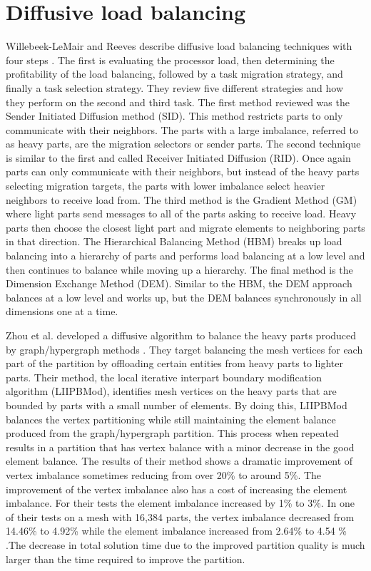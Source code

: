 \documentclass{thesis}
\begin{document}
\section{Diffusive load balancing}
Willebeek-LeMair and Reeves describe diffusive load balancing techniques with 
four steps \cite{loadbalance}. The first is evaluating the processor load, then 
determining the profitability of the load balancing, followed by a task 
migration strategy, and finally a task selection strategy. They review 
five different strategies and how they perform on the second and third task. 
The first method reviewed was the Sender Initiated Diffusion method (SID). 
This method restricts parts to only communicate with their neighbors. The 
parts with a large imbalance, referred to as heavy parts, are the migration 
selectors or sender parts. The second technique is 
similar to the first and called Receiver Initiated Diffusion (RID). Once again 
parts can only communicate with their neighbors, but instead of the heavy parts
selecting migration targets, the parts with lower imbalance select heavier 
neighbors to receive
load from. The third method is the Gradient Method (GM) where light parts send 
messages to all of the parts asking to receive load. Heavy parts then choose 
the closest light part and migrate elements to neighboring parts in that 
direction. The Hierarchical Balancing Method (HBM) breaks up load balancing 
into a 
hierarchy of parts and performs load balancing at a low level and then continues
to balance while moving up a hierarchy. The final method is the Dimension 
Exchange Method (DEM). Similar to the HBM, the DEM approach balances at a low 
level and works up, but the DEM balances synchronously in all dimensions one at 
a time.

Zhou et al. developed a diffusive algorithm to balance the heavy parts produced 
by graph/hypergraph methods \cite{zhougraph}. They target balancing the mesh 
vertices for each
part of the partition by offloading certain entities from heavy parts to 
lighter parts. Their method, the local iterative interpart boundary 
modification algorithm (LIIPBMod), identifies mesh vertices on the heavy parts
that are bounded by parts with a small number of elements. By doing this, 
LIIPBMod balances the vertex partitioning while still maintaining the element 
balance produced from the graph/hypergraph partition. This process when repeated 
results in a partition that has vertex balance with a minor decrease in the 
good element balance. The results of their method shows a dramatic improvement
of vertex imbalance sometimes reducing from over 20\% to around 5\%. The 
improvement of the vertex imbalance also has a cost of increasing the element 
imbalance. For their tests the element imbalance increased by 1\% to 3\%. In 
one of their tests on a mesh with 16,384 parts, the vertex imbalance decreased 
from 14.46\% to 4.92\% while the element imbalance increased from 2.64\% to 
4.54 \% \cite{zhougraph}.The decrease in total solution time due to the 
improved partition quality is much larger than the time required to improve the 
partition.
\end{document}
